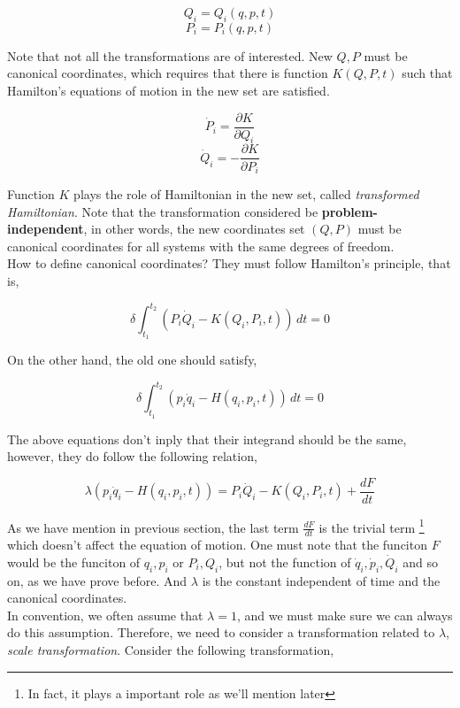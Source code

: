 \documentclass[12pt]{article}
\begin{document}
\begin{center}
    \[ Q_i = Q_i(q, p, t) \]
    \[ P_i = P_i(q, p, t) \]
\end{center}

Note that not all the transformations are of interested. New $Q, P$ must be canonical coordinates, which requires that there is function $K(Q, P, t)$ such that Hamilton's equations of motion in the new set are satisfied.

\begin{center}
    \[ \dot{P}_i = \frac{\partial K}{\partial Q_i} \]
    \[ \dot{Q}_i = - \frac{\partial K}{\partial P_i} \]
\end{center}

Function $K$ plays the role of Hamiltonian in the new set, called \textit{transformed Hamiltonian}. Note that the transformation considered be \textbf{problem-independent}, in other words, the new coordinates set $(Q,P)$ must be canonical coordinates for all systems with the same degrees of freedom.
\\
How to define canonical coordinates? They must follow Hamilton's principle, that is,

\begin{center}
    \[ \delta \int_{t_1}^{t_2} \left( P_i\dot{Q}_i - K(Q_i, P_i, t) \right) \, dt = 0 \]
\end{center}

On the other hand, the old one should satisfy, 

\begin{center}
    \[ \delta \int_{t_1}^{t_2} \left( p_i\dot{q}_i - H(q_i, p_i, t) \right) \, dt = 0 \]
\end{center}

The above equations don't inply that their integrand should be the same, however, they do follow the following relation,

\begin{center}
    \[ \lambda \left(p_i\dot{q}_i - H(q_i, p_i, t) \right) = P_i\dot{Q}_i - K(Q_i, P_i, t) + \frac{dF}{dt} \]
\end{center}

As we have mention in previous section, the last term $\frac{dF}{dt}$ is the trivial term \footnote{In fact, it plays a important role as we'll mention later} which doesn't affect the equation of motion. One must note that the funciton $F$ would be the funciton of $q_i, p_i$ or $P_i, Q_i$, but not the function of $\dot{q}_i, \dot{p}_i, \dot{Q}_i$ and so on, as we have prove before. And $\lambda$ is the constant independent of time and the canonical coordinates.
\\
\indent In convention, we often assume that $\lambda = 1$, and we must make sure we can always do this assumption. Therefore, we need to consider a transformation related to $\lambda$, \textit{scale transformation}. Consider the following transformation, 
\end{document}
